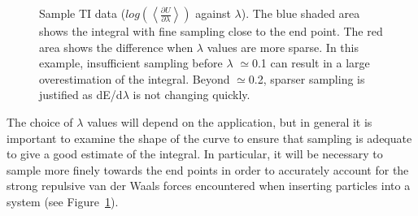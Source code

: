 \begin{figure}
  \caption{Sample TI data ($log(\left<\frac{\partial U}{\partial\lambda}\right>)$ against $\lambda$). The blue shaded
  area shows the integral with fine sampling close to the end point. The red area
  shows the difference when $\lambda$ values are more sparse. In this example,
  insufficient sampling before $\lambda$ $\simeq$0.1 can result in a large overestimation
  of the integral. Beyond $\simeq$0.2, sparser sampling is justified as dE/d$\lambda$ is not
  changing quickly.}
  \label{fig:TI}
\end{figure}


The choice of $\lambda$ values will depend on the application, but in general
it is important to examine the shape of the curve to ensure that sampling is
adequate to give a good estimate of the integral. In particular, it will be
necessary to sample more finely towards the end points in order to accurately
account for the strong repulsive van der Waals forces encountered when
inserting particles into a system (see Figure~\ref{fig:TI}).



%
%
%

%

